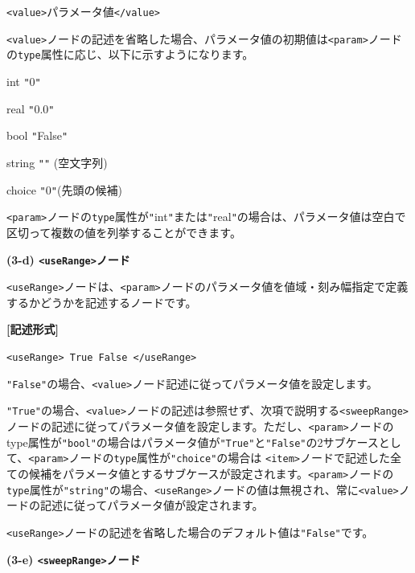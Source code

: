 \documentclass[a4paper,11pt]{jarticle}
\begin{document}
{\leftskip=42pt
\texttt{<value>}パラメータ値\texttt{</value>}

\vspace{8pt}
\leftskip=0pt
\texttt{<value>}ノードの記述を省略した場合、パラメータ値の初期値は\texttt{<param>}ノードの{\tt type}属性に応じ、以下に示すようになります。

\parindent=18pt
int \texttt{"}0\texttt{"}

real \texttt{"}0.0\texttt{"}

bool \texttt{"}False\texttt{"}

string \texttt{"}\texttt{"} (空文字列)

choice \texttt{"}0\texttt{"}(先頭の候補)

\parindent=0pt
\texttt{<param>}ノードの{\tt type}属性が\texttt{"}int\texttt{"}または\texttt{"}real\texttt{"}の場合は、パラメータ値は空白で区切って複数の値を列挙することができます。

\vspace{12pt}
\textbf{(3-d) \texttt{<useRange>}ノード}

\texttt{<useRange>}ノードは、\texttt{<param>}ノードのパラメータ値を値域・刻み幅指定で定義するかどうかを記述するノードです。

\vspace{8pt}
\leftskip=12pt
\textbf{[記述形式]}

\leftskip=42pt
\texttt{<useRange> True \textbar{} False </useRange>}

\vspace{8pt}
\leftskip=0pt
\texttt{"False"}の場合、\texttt{<value>}ノード記述に従ってパラメータ値を設定します。

\texttt{"True"}の場合、\texttt{<value>}ノードの記述は参照せず、次項で説明する\texttt{<sweepRange>}ノードの記述に従ってパラメータ値を設定します。ただし、\texttt{<param>}ノードのtype属性が\texttt{"bool"}の場合はパラメータ値が\texttt{"True"}と\texttt{"False"}の2サブケースとして、\texttt{<param>}ノードの{\tt type}属性が\texttt{"choice"}の場合は 
\texttt{<item>}ノードで記述した全ての候補をパラメータ値とするサブケースが設定されます。\texttt{<param>}ノードの{\tt type}属性が\texttt{"string"}の場合、\texttt{<useRange>}ノードの値は無視され、常に\texttt{<value>}ノードの記述に従ってパラメータ値が設定されます。

\texttt{<useRange>}ノードの記述を省略した場合のデフォルト値は\texttt{"False"}です。

\vspace{12pt}
\textbf{(3-e) \texttt{<sweepRange>}ノード}

}
\end{document}
